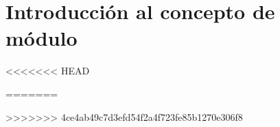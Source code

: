 \chapter{Introducción al concepto de módulo}





<<<<<<< HEAD
    
=======



    
>>>>>>> 4ce4ab49c7d3efd54f2a4f723fe85b1270e306f8
